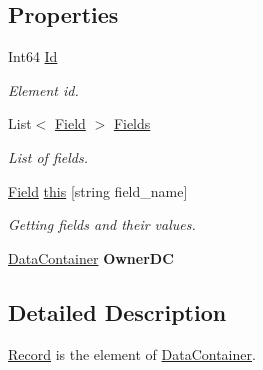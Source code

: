 \subsection*{Properties}
\begin{DoxyCompactItemize}
\item 
Int64 \hyperlink{class_dwarf_d_b_1_1_data_structures_1_1_record_a6b9df97308b20ff8504cd88c56aded41}{Id}
\begin{DoxyCompactList}\small\item\em Element id. \item\end{DoxyCompactList}\item 
List$<$ \hyperlink{class_dwarf_d_b_1_1_data_structures_1_1_field}{Field} $>$ \hyperlink{class_dwarf_d_b_1_1_data_structures_1_1_record_ae901326df950b811aa2cbb5f632a21c3}{Fields}
\begin{DoxyCompactList}\small\item\em List of fields. \item\end{DoxyCompactList}\item 
\hyperlink{class_dwarf_d_b_1_1_data_structures_1_1_field}{Field} \hyperlink{class_dwarf_d_b_1_1_data_structures_1_1_record_a303a0895fdeb635fa47469b2ac46c4a3}{this} \mbox{[}string field\_\-name\mbox{]}
\begin{DoxyCompactList}\small\item\em Getting fields and their values. \item\end{DoxyCompactList}\item 
\hypertarget{class_dwarf_d_b_1_1_data_structures_1_1_record_adc6c66e17187956974f6102e89054528}{
\hyperlink{class_dwarf_d_b_1_1_data_structures_1_1_data_container}{DataContainer} {\bfseries OwnerDC}}
\label{class_dwarf_d_b_1_1_data_structures_1_1_record_adc6c66e17187956974f6102e89054528}

\end{DoxyCompactItemize}


\subsection{Detailed Description}
\hyperlink{class_dwarf_d_b_1_1_data_structures_1_1_record}{Record} is the element of \hyperlink{class_dwarf_d_b_1_1_data_structures_1_1_data_container}{DataContainer}. 

